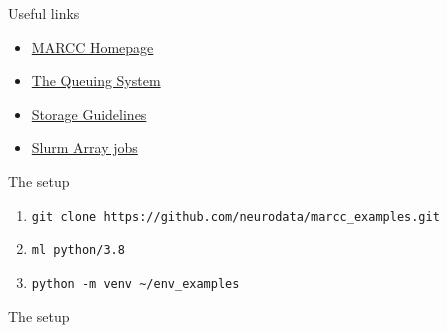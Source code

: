 \documentclass[xcolor=dvipsnames, aspectratio=169]{beamer}
\begin{document}

\begin{frame}{Useful links}
\begin{minipage}[t]{0.3\textwidth}
    \begin{itemize}
        \item \href{https://www.marcc.jhu.edu}{MARCC Homepage}
        \item \href{https://www.marcc.jhu.edu/getting-started/running-jobs/}{The Queuing System}
        \item \href{https://www.marcc.jhu.edu/troubleshoot/storage-guidelines/}{Storage Guidelines}
    \end{itemize}
\end{minipage}
\begin{minipage}[t]{0.3\textwidth}
    \begin{itemize}
        \item \href{https://slurm.schedmd.com/job_array.html}{Slurm Array jobs}
    \end{itemize}
\end{minipage}
\end{frame}

\begin{frame}[fragile]{The setup}
    \begin{enumerate}
        \item \verb;git clone https://github.com/neurodata/marcc_examples.git;
        \item \verb;ml python/3.8;
        \item \verb;python -m venv ~/env_examples;
    \end{enumerate}
\end{frame}



\begin{frame}{The setup}

\end{frame}
\end{document}
